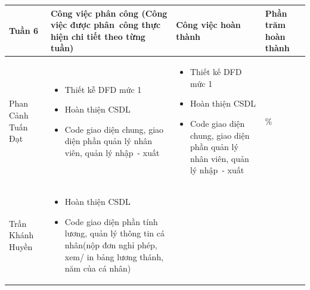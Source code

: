 \documentclass[a4paper,12pt]{report}
\begin{document}
\noindent
\begin{center}
    \begin{longtable}{|>{\centering\arraybackslash}p{3cm}|
        >{\centering\arraybackslash}p{5.5cm}|
        >{\centering\arraybackslash}p{5.5cm}|
        >{\centering\arraybackslash}p{1.5cm}|}
        \hline
        \textbf{Tuần 6}                                                                                                               &
        \textbf{Công việc phân công \newline
            (Công việc được phân~công thực hiện chi tiết theo từng tuần)
        }                                                                                                                             &
        \textbf{Công việc hoàn thành}                                                                                                 &
        \textbf{Phần trăm hoàn thành}                                                                                                         \\
        \hline
        Phan Cảnh Tuấn Đạt                                                                                                            &
        \begin{itemize}
            \item Thiết kễ DFD mức 1
            \item Hoàn thiện CSDL
            \item Code giao diện chung, giao diện phần quản lý nhân viên, quản lý nhập~- xuất
        \end{itemize}                                             &
        \begin{itemize}
            \item Thiết kế DFD mức 1
            \item Hoàn thiện CSDL
            \item Code giao diện chung, giao diện phần quản lý nhân viên, quản lý nhập~- xuất
        \end{itemize}
                                                                                                                                      & 100\% \\
        \hline
        Trần Khánh Huyền                                                                                                              &
        \begin{itemize}
            \item Hoàn thiện CSDL
            \item Code giao diện phần tính lương, quản lý thông tin cá nhân(nộp đơn nghỉ phép, xem/ in bảng lương thánh, năm của cá nhân)

\end{itemize}
\end{longtable}
\end{center}
\end{document}
